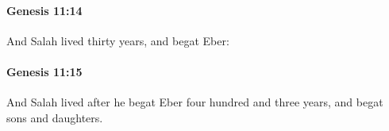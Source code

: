 		\paragraph{Genesis 11:14} %
			\label{GENESIS-11-14}

			And Salah lived thirty years, and begat Eber:


		\paragraph{Genesis 11:15} %
			\label{GENESIS-11-15}

			And Salah lived after he begat Eber four hundred and three years, and begat sons and daughters.


